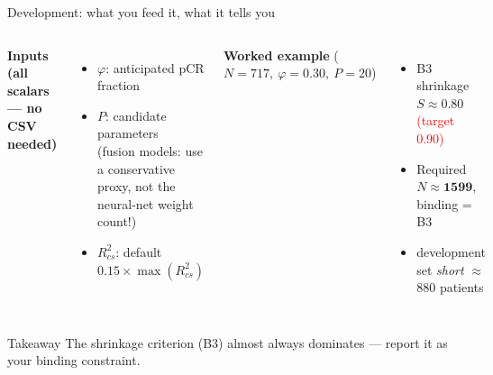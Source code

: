 \documentclass[10pt,aspectratio=169]{beamer}
\begin{document}
\begin{frame}{Development: what you feed it, what it tells you}
  \begin{columns}[t]
      \textbf{Inputs (all scalars --- no CSV needed)}
      \begin{itemize}
        \item $\varphi$: anticipated pCR fraction
        \item $P$: candidate parameters \\ {\scriptsize(fusion models: use a conservative proxy, not the neural-net weight count!)}
        \item $R^2_{cs}$: default $0.15\times\max(R^2_{cs})$
      \end{itemize}
      \textbf{Worked example} ($N=717,\ \varphi=0.30,\ P=20$)
      \begin{itemize}
        \item B3 shrinkage $S \approx 0.80$ \textcolor{red}{(target 0.90)}
        \item Required $N \approx \mathbf{1599}$, binding = B3
        \item[$\Rightarrow$] development set \emph{short} $\approx$ 880 patients
      \end{itemize}
  \end{columns}
  \vfill
  \begin{exampleblock}{Takeaway}
    The shrinkage criterion (B3) almost always dominates --- report it as your binding constraint.
  \end{exampleblock}
\end{frame}

\end{document}
